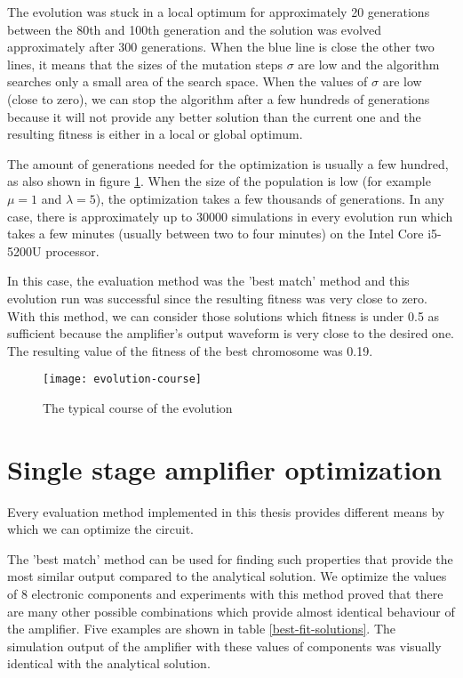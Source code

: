 The evolution was stuck in a local optimum for approximately 20 generations between the 80th and 100th generation and the solution was evolved approximately after 300 generations. When the blue line is close the other two lines, it means that the sizes of the mutation steps $\sigma$ are low and the algorithm searches only a small area of the search space. When the values of $\sigma$ are low (close to zero), we can stop the algorithm after a few hundreds of generations because it will not provide any better solution than the current one and the resulting fitness is either in a local or global optimum.

The amount of generations needed for the optimization is usually a few hundred, as also shown in figure \ref{evolution-course}. When the size of the population is low (for example $\mu = 1$ and $\lambda = 5$), the optimization takes a few thousands of generations. In any case, there is approximately up to 30000 simulations in every evolution run which takes a few minutes (usually between two to four minutes) on the Intel Core i5-5200U processor.

In this case, the evaluation method was the 'best match' method and this evolution run was successful since the resulting fitness was very close to zero. With this method, we can consider those solutions which fitness is under 0.5 as sufficient because the amplifier's output waveform is very close to the desired one. The resulting value of the fitness of the best chromosome was 0.19.

\begin{figure}[H]
    \centerline{\texttt{[image: evolution-course]}
    \label{evolution-course}}
    \caption{The typical course of the evolution}
\end{figure}

\section{Single stage amplifier optimization} \label{single-stage-results}
Every evaluation method implemented in this thesis provides different means by which we can optimize the circuit.

The 'best match' method can be used for finding such properties that provide the most similar output compared to the analytical solution. We optimize the values of 8 electronic components and experiments with this method proved that there are many other possible combinations which provide almost identical behaviour of the amplifier. Five examples are shown in table \ref{best-fit-solutions}. The simulation output of the amplifier with these values of components was visually identical with the analytical solution.



